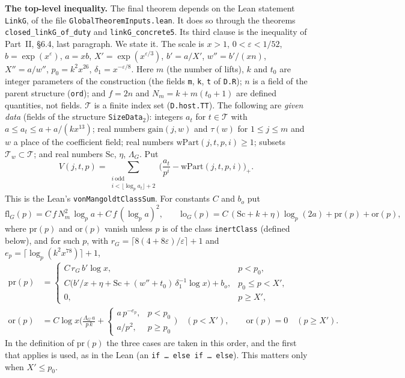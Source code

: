 \documentclass[11pt,letterpaper]{article}
\begin{document}
\textbf{The top-level inequality.} The final theorem depends on the Lean statement \texttt{LinkG}, of
the file \texttt{GlobalTheoremInputs.lean}. It does so through the theorems \texttt{closed\_linkG\_of\_duty}
and \texttt{linkG\_concrete5}.
Its third clause is the inequality of Part~II, \S6.4, last paragraph. We state it. The scale is
$x>1$, $0<\varepsilon<1/52$, $b=\exp(x^\varepsilon)$, $a=xb$, $X'=\exp(x^{\varepsilon/3})$, $b'=a/X'$,
$w''=b'/(xn)$, $X''=a/w''$, $p_0=k^2x^{26}$, $\delta_1=x^{-\varepsilon/8}$. Here $m$ (the number of lifts),
$k$ and $t_0$ are integer parameters of the construction (the fields \texttt{m}, \texttt{k}, \texttt{t} of
\texttt{D.R}); $n$ is a field of the parent structure (\texttt{ord}); and $f=2n$ and $N_m=k+m(t_0+1)$ are
defined quantities, not fields. $\mathcal T$ is a finite index set (\texttt{D.host.TT}). The
following are \emph{given data} (fields of the structure \texttt{SizeData}$_2$): integers $a_t$ for
$t\in\mathcal T$ with $a\le a_t\le a+a/(kx^{13})$; real
numbers $\mathrm{gain}(j,w)$ and $\tau(w)$ for $1\le j\le m$ and $w$ a place of the coefficient field; real
numbers $\mathrm{wPart}(j,t,p,i)\ge1$; subsets $\mathcal T_w\subset\mathcal T$; and real numbers
$\mathrm{Sc}$, $\eta$, $\Lambda_G$. Put
\begin{equation}\label{dv:V}
 V(j,t,p)=\sum_{\substack{i\ \mathrm{odd}\\ i<\lfloor\log_pa_t\rfloor+2}}
   \Big(\frac{a_t}{p^i}-\mathrm{wPart}(j,t,p,i)\Big)_+ .
\end{equation}
This is the Lean's \texttt{vonMangoldtClassSum}. For constants $C$ and $b_o$ put
\begin{equation}\label{dv:fl}
 \mathrm{fl}_G(p)=C\,f\,N_m^2\,\log_pa+C\,f\,(\log_pa)^2,\qquad
 \mathrm{lo}_G(p)=C\,(\mathrm{Sc}+k+\eta)\log_p(2a)+\mathrm{pr}(p)+\mathrm{or}(p),
\end{equation}
where $\mathrm{pr}(p)$ and $\mathrm{or}(p)$ vanish unless $p$ is of the class \texttt{inertClass}
(defined below), and for such $p$, with $r_G=\lceil8(4+8\varepsilon)/\varepsilon\rceil+1$ and
$e_p=\lceil\log_p(k^2x^{78})\rceil+1$,
\begin{equation}\label{dv:lo}
\begin{aligned}
 \mathrm{pr}(p)&=\begin{cases}C\,r_G\,b'\log x,& p<p_0,\\
   C\big(b'/x+\eta+\mathrm{Sc}+(w''+t_0)\,\delta_1^{-1}\log x\big)+b_o,& p_0\le p<X',\\ 0,&p\ge X',\end{cases}\\
 \mathrm{or}(p)&=C\log x\Big(\frac{\Lambda_G\,a}{p\,k}+\begin{cases}a\,p^{-e_p},&p<p_0\\ a/p^2,&p\ge p_0\end{cases}\Big)
 \quad(p<X'),\qquad \mathrm{or}(p)=0\quad(p\ge X').
\end{aligned}
\end{equation}
In the definition of $\mathrm{pr}(p)$ the three cases are taken in this order, and the first that applies is
used, as in the Lean (an \texttt{if \ldots\ else if \ldots\ else}). This matters only when $X'\le p_0$.
\end{document}

